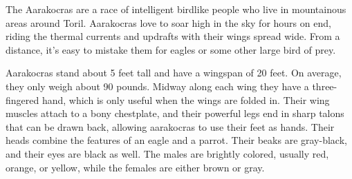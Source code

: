 
The Aarakocras are a race of intelligent birdlike people who live in mountainous areas around Toril. Aarakocras love to soar high in the sky for hours on end, riding the thermal currents and updrafts with their wings spread wide. From a distance, it’s easy to mistake them for eagles or some other large bird of prey.

Aarakocras stand about 5 feet tall and have a wingspan of 20 feet. On average, they only weigh about 90 pounds. Midway along each wing they have a three-fingered hand, which is only useful when the wings are folded in. Their wing muscles attach to a bony chestplate, and their powerful legs end in sharp talons that can be drawn back, allowing aarakocras to use their feet as hands. Their heads combine the features of an eagle and a parrot. Their beaks are gray-black, and their eyes are black as well. The males are brightly colored, usually red, orange, or yellow, while the females are either brown or gray.

